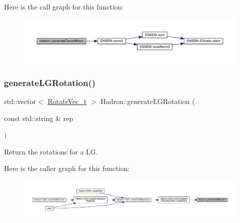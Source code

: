 Here is the call graph for this function\+:
\nopagebreak
\begin{figure}[H]
\begin{center}
\leavevmode
\includegraphics[width=350pt]{d1/daf/namespaceHadron_af42e0a1c54e10b67abac83c56c67b40e_cgraph}
\end{center}
\end{figure}
\mbox{\label{namespaceHadron_a4467e73143184e2935f0f0f0e31079bc}} 
\subsubsection{\texorpdfstring{generateLGRotation()}{generateLGRotation()}}
{\footnotesize\ttfamily std\+::vector$<$ \mbox{\hyperlink{structHadron_1_1RotateVec__t}{Rotate\+Vec\+\_\+t}} $>$ Hadron\+::generate\+L\+G\+Rotation (\begin{DoxyParamCaption}\item[{const std\+::string \&}]{rep }\end{DoxyParamCaption})}



Return the rotations for a LG. 

Here is the caller graph for this function\+:
\nopagebreak
\begin{figure}[H]
\begin{center}
\leavevmode
\includegraphics[width=350pt]{d1/daf/namespaceHadron_a4467e73143184e2935f0f0f0e31079bc_icgraph}
\end{center}
\end{figure}
\mbox{\label{namespaceHadron_a511bab858a88c02ec88a697fd5430e0d}} 
